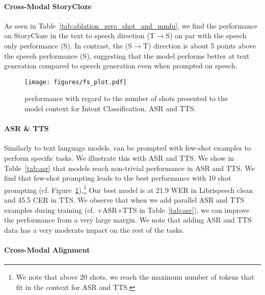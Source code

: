 \paragraph{Cross-Modal StoryCloze}  As seen in Table~\ref{tab:ablation_zero_shot_and_mmlu}, we find the performance on StoryCloze in the text to speech direction (T$\rightarrow$S) on par with the speech only performance (S). In contrast, the (S$\rightarrow$T) direction is about 5 points %
above the speech performance (S), suggesting that the model performs better at text generation compared to speech generation even when prompted on speech. 
\begin{figure}[h]
  \centering
  \texttt{[image: figures/fs\_plot.pdf]}
  \caption{\spotbase performance with regard to the number of shots presented to the model context for Intent Classification, ASR and TTS. }
  \label{fig:few_shots}
\end{figure}
\paragraph{ASR \& TTS}

Similarly to text language models, \spot can be prompted with few-shot examples to perform specific tasks. We illustrate this with ASR and TTS. We show in Table~\ref{tab:asr} that \spot models reach non-trivial performance in ASR and TTS. We find that few-shot prompting leads to the best performance with 10 shot prompting (cf. Figure~\ref{fig:few_shots}).\footnote{We note that above 20 shots, we reach the maximum number of tokens that fit in the context for ASR and TTS.} Our best \spotbase model is at 21.9 WER in Librispeech clean and 45.5 CER in TTS. 
We observe that when we add parallel ASR and TTS examples during training (cf. +ASR+TTS in Table~\ref{tab:asr}), we can improve the performance from a very large margin. We note that adding ASR and TTS data has a very moderate impact on the rest of the tasks. 

\paragraph{Cross-Modal Alignment} 

